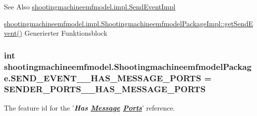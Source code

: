 \begin{DoxySeeAlso}{See Also}
\hyperlink{classshootingmachineemfmodel_1_1impl_1_1_send_event_impl}{shootingmachineemfmodel.\-impl.\-Send\-Event\-Impl} 

\hyperlink{classshootingmachineemfmodel_1_1impl_1_1_shootingmachineemfmodel_package_impl_aa809696addcdd5ce6873eae0d5f4c1e6}{shootingmachineemfmodel.\-impl.\-Shootingmachineemfmodel\-Package\-Impl\-::get\-Send\-Event()} Generierter Funktionsblock 
\end{DoxySeeAlso}
\hypertarget{interfaceshootingmachineemfmodel_1_1_shootingmachineemfmodel_package_ac31f545cdd504a45890a4d2f6dd739a1}{
\subsubsection[{S\-E\-N\-D\-\_\-\-E\-V\-E\-N\-T\-\_\-\-\_\-\-H\-A\-S\-\_\-\-M\-E\-S\-S\-A\-G\-E\-\_\-\-P\-O\-R\-T\-S}]{\setlength{\rightskip}{0pt plus 5cm}int shootingmachineemfmodel.\-Shootingmachineemfmodel\-Package.\-S\-E\-N\-D\-\_\-\-E\-V\-E\-N\-T\-\_\-\-\_\-\-H\-A\-S\-\_\-\-M\-E\-S\-S\-A\-G\-E\-\_\-\-P\-O\-R\-T\-S = {\bf S\-E\-N\-D\-E\-R\-\_\-\-P\-O\-R\-T\-S\-\_\-\-\_\-\-H\-A\-S\-\_\-\-M\-E\-S\-S\-A\-G\-E\-\_\-\-P\-O\-R\-T\-S}}}\label{interfaceshootingmachineemfmodel_1_1_shootingmachineemfmodel_package_ac31f545cdd504a45890a4d2f6dd739a1}
The feature id for the '{\itshape {\bfseries Has \hyperlink{interfaceshootingmachineemfmodel_1_1_message}{Message} \hyperlink{interfaceshootingmachineemfmodel_1_1_ports}{Ports}}}' reference.

